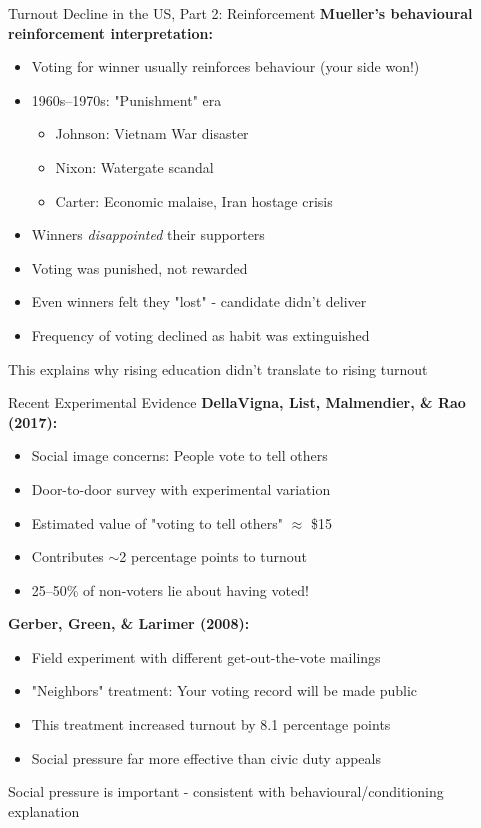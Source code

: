 \documentclass[10pt]{beamer}
\begin{document}
\begin{frame}{Turnout Decline in the US, Part 2: Reinforcement} 
\textbf{Mueller's behavioural reinforcement interpretation:}
\begin{itemize}
\item Voting for winner usually reinforces behaviour (your side won!)
\item \alert{1960s--1970s: "Punishment" era}
\begin{itemize}
\item Johnson: Vietnam War disaster
\item Nixon: Watergate scandal
\item Carter: Economic malaise, Iran hostage crisis
\end{itemize}
\item Winners \emph{disappointed} their supporters
\item \alert{Voting was punished, not rewarded}
\item Even winners felt they "lost" - candidate didn't deliver
\item Frequency of voting declined as habit was extinguished
\end{itemize}

This explains why rising education didn't translate to rising turnout
\end{frame}

\begin{frame}{Recent Experimental Evidence}
\textbf{DellaVigna, List, Malmendier, \& Rao (2017):}
\begin{itemize}
\item Social image concerns: People vote to tell others
\item Door-to-door survey with experimental variation
\item Estimated value of "voting to tell others" $\approx$ \$15
\item Contributes $\sim$2 percentage points to turnout
\item 25--50\% of non-voters \alert{lie} about having voted!
\end{itemize}


\textbf{Gerber, Green, \& Larimer (2008):}
\begin{itemize}
\item Field experiment with different get-out-the-vote mailings
\item "Neighbors" treatment: Your voting record will be made public
\item This treatment increased turnout by \alert{8.1 percentage points}
\item Social pressure far more effective than civic duty appeals
\end{itemize}


Social pressure is important - consistent with behavioural/conditioning explanation
\end{frame}
\end{document}
